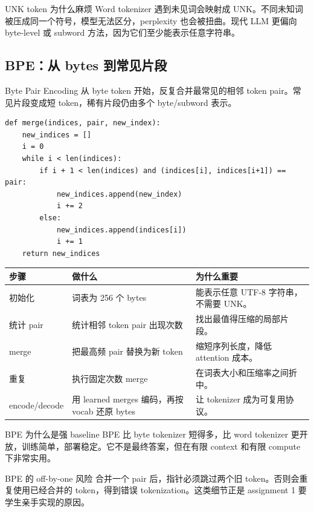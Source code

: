 \begin{warningbox}{UNK token 为什么麻烦}
Word tokenizer 遇到未见词会映射成 UNK。不同未知词被压成同一个符号，模型无法区分，perplexity 也会被扭曲。现代 LLM 更偏向 byte-level 或 subword 方法，因为它们至少能表示任意字符串。
\end{warningbox}

\subsection{BPE：从 bytes 到常见片段}

Byte Pair Encoding 从 byte token 开始，反复合并最常见的相邻 token pair。常见片段变成短 token，稀有片段仍由多个 byte/subword 表示。

\begin{lstlisting}[caption={BPE merge 的核心逻辑}]
def merge(indices, pair, new_index):
    new_indices = []
    i = 0
    while i < len(indices):
        if i + 1 < len(indices) and (indices[i], indices[i+1]) == pair:
            new_indices.append(new_index)
            i += 2
        else:
            new_indices.append(indices[i])
            i += 1
    return new_indices
\end{lstlisting}

\begin{longtable}{p{}p{}p{}}
\toprule
\textbf{步骤} & \textbf{做什么} & \textbf{为什么重要} \\
\midrule
初始化 & 词表为 256 个 bytes & 能表示任意 UTF-8 字符串，不需要 UNK。 \\
统计 pair & 统计相邻 token pair 出现次数 & 找出最值得压缩的局部片段。 \\
merge & 把最高频 pair 替换为新 token & 缩短序列长度，降低 attention 成本。 \\
重复 & 执行固定次数 merge & 在词表大小和压缩率之间折中。 \\
encode/decode & 用 learned merges 编码，再按 vocab 还原 bytes & 让 tokenizer 成为可复用协议。 \\
\bottomrule
\end{longtable}

\begin{importantbox}{BPE 为什么是强 baseline}
BPE 比 byte tokenizer 短得多，比 word tokenizer 更开放，训练简单，部署稳定。它不是最终答案，但在有限 context 和有限 compute 下非常实用。
\end{importantbox}

\begin{warningbox}{BPE 的 off-by-one 风险}
合并一个 pair 后，指针必须跳过两个旧 token。否则会重复使用已经合并的 token，得到错误 tokenization。这类细节正是 assignment 1 要学生亲手实现的原因。
\end{warningbox}


